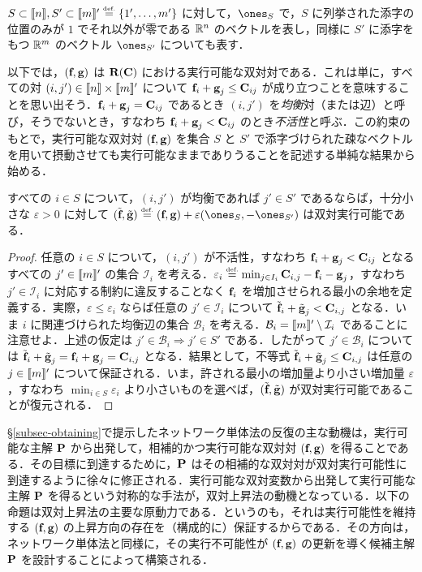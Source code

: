 \begin{defn} $S\subset\range{n},S'\subset\range{m}'\eqdef \{1',\dots,m'\}$ に対して，$\ones_S$ で，$S$ に列挙された添字の位置のみが $1$ でそれ以外が零である $\RR^n$ のベクトルを表し，同様に $S'$ に添字をもつ $\RR^m$ のベクトル $\ones_{S'}$ についても表す．
\end{defn}

以下では，$(\fD,\gD)$ は $\PotentialsD(\C)$ における実行可能な双対対である．これは単に，すべての対 $(i,j')\in\range{n}\times\range{m}'$ について $\fD_i+\gD_j\leq\C_{ij}$ が成り立つことを意味することを思い出そう．$\fD_i+\gD_j=\C_{ij}$ であるとき $(i,j')$ を\emph{均衡}対（または辺）と呼び，そうでないとき，すなわち $\fD_i+\gD_j<\C_{ij}$ のとき\emph{不活性}と呼ぶ．この約束のもとで，実行可能な双対対 $(\fD,\gD)$ を集合 $S$ と $S'$ で添字づけられた疎なベクトルを用いて摂動させても実行可能なままでありうることを記述する単純な結果から始める．

\begin{prop}\label{prop-feasibility-dual-pair}
すべての $i\in S$ について，$(i,j')$ が均衡であれば $j'\in S'$ であるならば，十分小さな $\varepsilon>0$ に対して $(\tilde{\fD},\tilde{\gD})\eqdef(\fD,\gD)+\varepsilon(\ones_S,-\ones_{S'})$ は双対実行可能である．
\end{prop}
\begin{proof}
任意の $i\in S$ について，$(i,j')$ が不活性，すなわち $\fD_i+\gD_j<\C_{ij}$ となるすべての $j'\in\range{m}'$ の集合 $\mathcal{I}_{i}$ を考える．$\varepsilon_i \eqdef \min_{j\in I_{i}} \C_{i,j}-\fD_i-\gD_j$，すなわち $j'\in \mathcal{I}_i$ に対応する制約に違反することなく $\fD_i$ を増加させられる最小の余地を定義する．実際，$\varepsilon\leq \varepsilon_i$ ならば任意の $j'\in \mathcal{I}_i$ について $\tilde{\fD}_i+\tilde{\gD}_j<\C_{i,j}$ となる．いま $i$ に関連づけられた均衡辺の集合 $\mathcal{B}_i$ を考える．$\mathcal{B}_i=\range{m}'\setminus \mathcal{I}_i$ であることに注意せよ．上述の仮定は $j'\in\mathcal{B}_i\Rightarrow j'\in S'$ である．したがって $j'\in\mathcal{B}_i$ については $\tilde{\fD}_i+\tilde{\gD}_j=\fD_i+\gD_j=\C_{i,j}$ となる．結果として，不等式 $\tilde{\fD}_i+\tilde{\gD}_j\leq \C_{i,j}$ は任意の $j\in \range{m}'$ について保証される．いま，許される最小の増加量より小さい増加量 $\varepsilon$，すなわち $\min_{i\in S} \varepsilon_i$ より小さいものを選べば，$(\tilde{\fD},\tilde{\gD})$ が双対実行可能であることが復元される．
\end{proof}

\S\ref{subsec-obtaining}で提示したネットワーク単体法の反復の主な動機は，実行可能な主解 $\P$ から出発して，相補的かつ実行可能な双対対 $(\fD,\gD)$ を得ることである．その目標に到達するために，$\P$ はその相補的な双対対が双対実行可能性に到達するように徐々に修正される．実行可能な双対変数から出発して実行可能な主解 $\P$ を得るという対称的な手法が，双対上昇法の動機となっている．以下の命題は双対上昇法の主要な原動力である．というのも，それは実行可能性を維持する $(\fD,\gD)$ の上昇方向の存在を（構成的に）保証するからである．その方向は，ネットワーク単体法と同様に，その実行不可能性が $(\fD,\gD)$ の更新を導く候補主解 $\P$ を設計することによって構築される．


